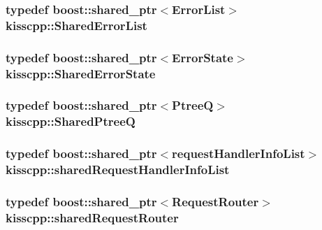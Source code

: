 \hypertarget{namespacekisscpp_a97f51b10e50fc4e1f9142a9e909d477b}{
\subsubsection[{Shared\-Error\-List}]{\setlength{\rightskip}{0pt plus 5cm}typedef boost\-::shared\-\_\-ptr$<${\bf Error\-List}$>$ {\bf kisscpp\-::\-Shared\-Error\-List}}}\label{namespacekisscpp_a97f51b10e50fc4e1f9142a9e909d477b}
\hypertarget{namespacekisscpp_af77de115307b379cbcab83a1fc54fdad}{
\subsubsection[{Shared\-Error\-State}]{\setlength{\rightskip}{0pt plus 5cm}typedef boost\-::shared\-\_\-ptr$<${\bf Error\-State}$>$ {\bf kisscpp\-::\-Shared\-Error\-State}}}\label{namespacekisscpp_af77de115307b379cbcab83a1fc54fdad}
\hypertarget{namespacekisscpp_aecf9f29bb4c41e0d4dbc74731a3020cd}{
\subsubsection[{Shared\-Ptree\-Q}]{\setlength{\rightskip}{0pt plus 5cm}typedef boost\-::shared\-\_\-ptr$<${\bf Ptree\-Q}$>$ {\bf kisscpp\-::\-Shared\-Ptree\-Q}}}\label{namespacekisscpp_aecf9f29bb4c41e0d4dbc74731a3020cd}
\hypertarget{namespacekisscpp_aa107348bd263ff2c9358b497155d37b8}{
\subsubsection[{shared\-Request\-Handler\-Info\-List}]{\setlength{\rightskip}{0pt plus 5cm}typedef boost\-::shared\-\_\-ptr$<${\bf request\-Handler\-Info\-List}$>$ {\bf kisscpp\-::shared\-Request\-Handler\-Info\-List}}}\label{namespacekisscpp_aa107348bd263ff2c9358b497155d37b8}
\hypertarget{namespacekisscpp_a203bb476deb3940ecd3f21668dd3cdff}{
\subsubsection[{shared\-Request\-Router}]{\setlength{\rightskip}{0pt plus 5cm}typedef boost\-::shared\-\_\-ptr$<${\bf Request\-Router}$>$ {\bf kisscpp\-::shared\-Request\-Router}}}\label{namespacekisscpp_a203bb476deb3940ecd3f21668dd3cdff}
